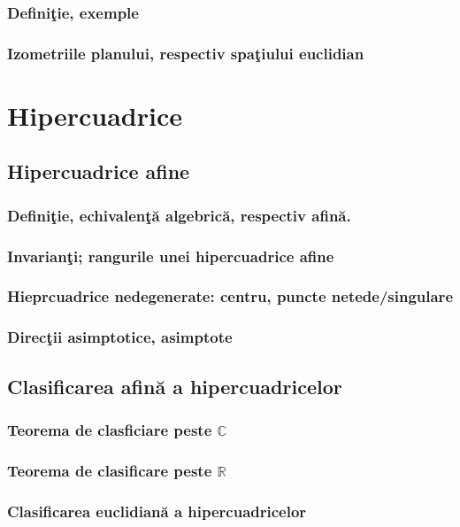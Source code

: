 \documentclass[12pt]{book}
\def\C{\mathbb C}
\def\R{\mathbb R}
\begin{document}
\subsection{Defini\c tie, exemple}
\subsection{Izometriile planului, respectiv spa\c tiului euclidian}
\chapter{ Hipercuadrice}

\section{ Hipercuadrice afine}
\subsection{Defini\c tie, echivalen\c t\u a algebric\u a, respectiv afin\u a.}
\subsection{Invarian\c ti; rangurile unei hipercuadrice afine}
\subsection{Hieprcuadrice nedegenerate: centru, puncte netede/singulare}
\subsection{Direc\c tii asimptotice, asimptote}

\section{Clasificarea afin\u a a hipercuadricelor}
\subsection{Teorema  de clasficiare peste $\C$}
\subsection{Teorema de clasificare peste $\R$}

\subsection{Clasificarea euclidian\u a a hipercuadricelor}
\end{document}
